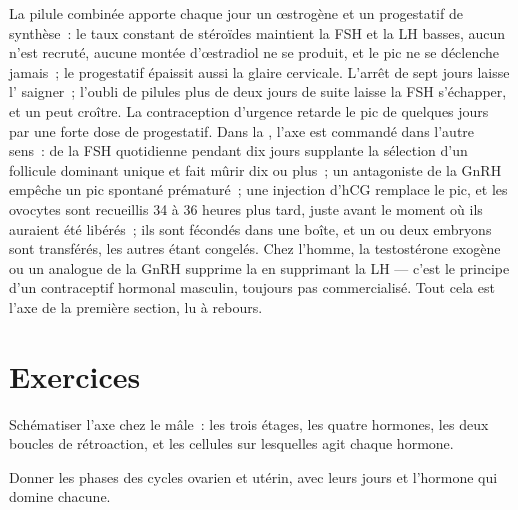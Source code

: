 \begin{proposition}\label{prop:b2:reproductive-hormones:clinic}
La pilule combinée apporte chaque jour un œstrogène et un progestatif de
synthèse~: le taux constant de stéroïdes maintient la FSH et la LH
basses, aucun  n'est recruté, aucune montée d'œstradiol ne se
produit, et le pic ne se déclenche jamais~; le progestatif épaissit
aussi la glaire cervicale. L'arrêt de sept jours laisse l'
saigner~; l'oubli de pilules plus de deux jours de suite laisse la FSH
s'échapper, et un  peut croître. La contraception d'urgence
retarde le pic de quelques jours par une forte dose de progestatif.
Dans la \emph{}, l'axe est commandé dans l'autre
sens~: de la FSH quotidienne pendant dix jours supplante la sélection
d'un follicule dominant unique et fait mûrir dix  ou plus~; un
antagoniste de la GnRH empêche un pic spontané prématuré~; une injection
d'hCG remplace le pic, et les ovocytes sont recueillis 34 à 36 heures
plus tard, juste avant le moment où ils auraient été libérés~; ils sont
fécondés dans une boîte, et un ou deux embryons sont transférés, les
autres étant congelés. Chez l'homme, la testostérone exogène ou un
analogue de la GnRH supprime la  en supprimant la LH ---
c'est le principe d'un contraceptif hormonal masculin, toujours pas
commercialisé. Tout cela est l'axe de la première section, lu à
rebours.
\end{proposition}

\section{Exercices}

\begin{exercise}[$\star$]\label{exo:b2:reproductive-hormones:1}
Schématiser l'axe chez le mâle~: les trois étages, les quatre hormones,
les deux boucles de rétroaction, et les cellules sur lesquelles agit
chaque hormone.
\end{exercise}

\begin{exercise}[$\star$]\label{exo:b2:reproductive-hormones:2}
Donner les phases des cycles ovarien et utérin, avec leurs jours et
l'hormone qui domine chacune.
\end{exercise}

